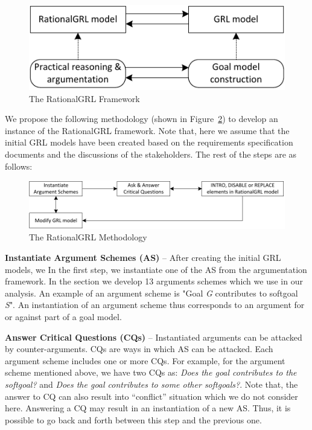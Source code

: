 \begin{figure}[ht]
\centering
\includegraphics[scale=0.4]{img/framework}
\caption{The RationalGRL Framework}
\label{fig:rationalgrl-framework}
\end{figure}

We propose the following methodology (shown in Figure~\ref{fig:rationalgrl-methodology}) to develop an instance of the RationalGRL framework. Note that, here we assume that the initial GRL models have been created based on the requirements specification documents and the discussions of the stakeholders. The rest of the steps are as follows:

\begin{figure}[ht]
\centering
\includegraphics[scale=0.4]{img/methodology}
\caption{The RationalGRL Methodology}
\label{fig:rationalgrl-methodology}
\end{figure}


\textbf{Instantiate Argument Schemes (AS)} -- After creating the initial GRL models, we In the first step, we instantiate one of the AS from the argumentation framework. In the section we develop 13 arguments schemes which we use in our analysis. An example of an argument scheme is "Goal \emph{G} contributes to softgoal \emph{S}". An instantiation of an argument scheme thus corresponds to an argument for or against part of a goal model.

\textbf{Answer Critical Questions (CQs)} -- Instantiated arguments can be attacked by counter-arguments. CQs are ways in which AS can be attacked. Each argument scheme includes one or more CQs. For example, for the argument scheme mentioned above, we have two CQs as: \emph{Does the goal contributes to the softgoal?} and \emph{Does the goal contributes to some other softgoals?}. Note that, the answer to CQ can also result into ``conflict'' situation which we do not consider here. Answering a CQ may result in an instantiation of a new AS. Thus, it is possible to go back and forth between this step and the previous one.

